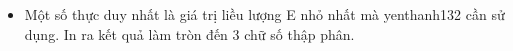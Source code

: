 \begin{itemize}
	\item Một số thực duy nhất là giá trị liều lượng E nhỏ nhất mà yenthanh132 cần sử dụng. In ra kết quả làm tròn đến 3 chữ số thập phân.
\end{itemize}